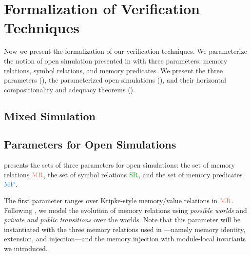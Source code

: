 \section{Formalization of Verification Techniques}
\label{sec:compiler:verification}

Now we present the formalization of our verification techniques.
We parameterize the notion of open simulation presented in
 with three parameters: memory relations, symbol
relations, and memory predicates.  We present the three parameters
(), the parameterized open simulations
(), and their horizontal compositionality and adequacy theorems
().

\subsection{Mixed Simulation}


\subsection{Parameters for Open Simulations}
\label{sec:main-verification:parameter}

 presents
the sets of three parameters for open simulations:
the set of memory relations $\MREL$, the set of symbol relations $\SREL$, and the set of memory predicates $\MPRED$.




The first parameter ranges over Kripke-style memory/value relations in $\MREL$.
Following \cite{DBLP:conf/icfp/DreyerNB10,pb}, we model the
evolution of memory relations using \emph{possible worlds} and \emph{private and public transitions}
over the worlds.
Note that this parameter will be instantiated with the three memory relations used in \cc{}---namely memory
identity, extension, and injection---and the memory injection with module-local invariants we introduced.

